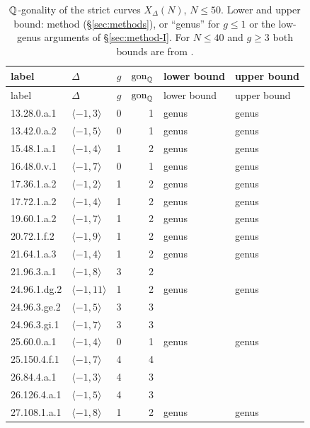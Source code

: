 \begin{longtable}{llrrll}
\caption{$\mathbb{Q}$-gonality of the strict curves $X_\Delta(N)$, $N\le50$. Lower and upper bound: method
 (\S\ref{sec:methods}), or ``genus'' for $g\le1$ or the low-genus arguments of \S\ref{sec:method-I}.
 For $N\le40$ and $g\ge3$ both bounds are from \cite[Theorem~1.2, Table~1]{Orlic2025}.}\label{tab:C}\\
\toprule label & $\Delta$ & $g$ & $\operatorname{gon}_{\mathbb{Q}}$ & lower bound & upper bound\\\midrule\endfirsthead
\toprule label & $\Delta$ & $g$ & $\operatorname{gon}_{\mathbb{Q}}$ & lower bound & upper bound\\\midrule\endhead
13.28.0.a.1 & $\langle -1,3\rangle$ & 0 & 1 & genus & genus\\
13.42.0.a.2 & $\langle -1,5\rangle$ & 0 & 1 & genus & genus\\
15.48.1.a.1 & $\langle -1,4\rangle$ & 1 & 2 & genus & genus\\
16.48.0.v.1 & $\langle -1,7\rangle$ & 0 & 1 & genus & genus\\
17.36.1.a.2 & $\langle -1,2\rangle$ & 1 & 2 & genus & genus\\
17.72.1.a.2 & $\langle -1,4\rangle$ & 1 & 2 & genus & genus\\
19.60.1.a.2 & $\langle -1,7\rangle$ & 1 & 2 & genus & genus\\
20.72.1.f.2 & $\langle -1,9\rangle$ & 1 & 2 & genus & genus\\
21.64.1.a.3 & $\langle -1,4\rangle$ & 1 & 2 & genus & genus\\
21.96.3.a.1 & $\langle -1,8\rangle$ & 3 & 2 & \cite{Orlic2025} & \cite{Orlic2025}\\
24.96.1.dg.2 & $\langle -1,11\rangle$ & 1 & 2 & genus & genus\\
24.96.3.ge.2 & $\langle -1,5\rangle$ & 3 & 3 & \cite{Orlic2025} & \cite{Orlic2025}\\
24.96.3.gi.1 & $\langle -1,7\rangle$ & 3 & 3 & \cite{Orlic2025} & \cite{Orlic2025}\\
25.60.0.a.1 & $\langle -1,4\rangle$ & 0 & 1 & genus & genus\\
25.150.4.f.1 & $\langle -1,7\rangle$ & 4 & 4 & \cite{Orlic2025} & \cite{Orlic2025}\\
26.84.4.a.1 & $\langle -1,3\rangle$ & 4 & 3 & \cite{Orlic2025} & \cite{Orlic2025}\\
26.126.4.a.1 & $\langle -1,5\rangle$ & 4 & 3 & \cite{Orlic2025} & \cite{Orlic2025}\\
27.108.1.a.1 & $\langle -1,8\rangle$ & 1 & 2 & genus & genus\\

\end{longtable}
